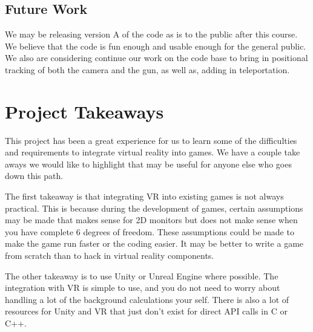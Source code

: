 \documentclass[journal]{IEEEtran}
\begin{document}
\subsection{Future Work}
We may be releasing version A of the code as is to the public after this course. We believe that the code is fun enough and usable enough for the general public. We also are considering continue our work on the code base to bring in positional tracking of both the camera and the gun, as well as, adding in teleportation. 

\section{Project Takeaways}

This project has been a great experience for us to learn some of the difficulties and requirements to integrate virtual reality into games. We have a couple take aways we would like to highlight that may be useful for anyone else who goes down this path. 

The first takeaway is that integrating VR into existing games is not always practical. This is because during the development of games, certain assumptions may be made that makes sense for 2D monitors but does not make sense when you have complete 6 degrees of freedom. These assumptions could be made to make the game run faster or the coding easier. It may be better to write a game from scratch than to hack in virtual reality components. 

The other takeaway is to use Unity or Unreal Engine where possible. The integration with VR is simple to use, and you do not need to worry about handling a lot of the background calculations your self. There is also a lot of resources for Unity and VR that just don't exist for direct API calls in C or C++. 
\end{document}
